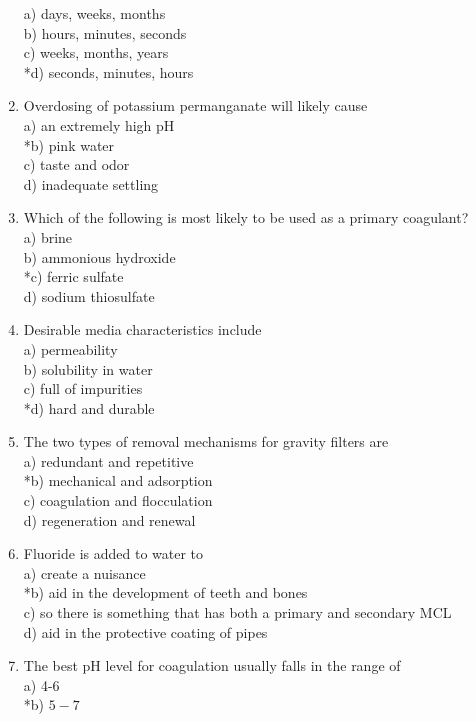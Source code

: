 \begin{enumerate}
a) days, weeks, months\\
b) hours, minutes, seconds\\
c) weeks, months, years\\
*d) seconds, minutes, hours\\
\item Overdosing of potassium permanganate will likely cause\\
a) an extremely high $\mathrm{pH}$\\
*b) pink water\\
c) taste and odor\\
d) inadequate settling\\
\item Which of the following is most likely to be used as a primary coagulant?\\
a) brine\\
b) ammonious hydroxide\\
*c) ferric sulfate\\
d) sodium thiosulfate\\
\item Desirable media characteristics include\\
a) permeability\\
b) solubility in water\\
c) full of impurities\\
*d) hard and durable\\
\item The two types of removal mechanisms for gravity filters are\\
a) redundant and repetitive\\
*b) mechanical and adsorption\\
c) coagulation and flocculation\\
d) regeneration and renewal\\
\item Fluoride is added to water to\\
a) create a nuisance\\
*b) aid in the development of teeth and bones\\
c) so there is something that has both a primary and secondary MCL\\
d) aid in the protective coating of pipes\\
\item The best pH level for coagulation usually falls in the range of\\
a) 4-6\\
*b) $5-7$\\

\end{enumerate}
